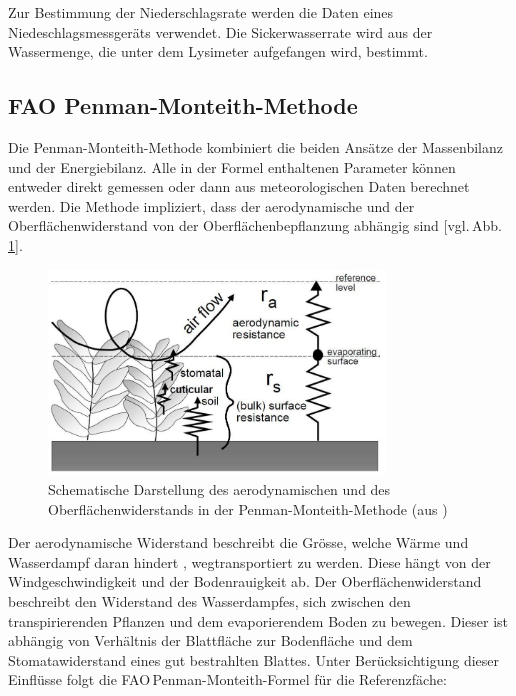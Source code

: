 Zur Bestimmung der Niederschlagsrate werden die Daten eines Niedeschlagsmessgeräts verwendet. Die Sickerwasserrate wird aus der Wassermenge, die unter dem Lysimeter aufgefangen wird, bestimmt.

\subsection{FAO Penman-Monteith-Methode}

Die Penman-Monteith-Methode kombiniert die beiden Ansätze der Massenbilanz und der Energiebilanz. Alle in der Formel enthaltenen Parameter können entweder direkt gemessen oder dann aus meteorologischen Daten berechnet werden. Die Methode impliziert, dass der aerodynamische und der Oberflächenwiderstand von der Oberflächenbepflanzung abhängig sind [vgl.\,Abb.\,\ref{fig:widerstand}]. 

\begin{figure}[H]
\centering
\includegraphics[width=0.8\textwidth]{figures/penman_widerstand.jpg}
\caption{Schematische Darstellung des aerodynamischen und des Oberflächenwiderstands in der Penman-Monteith-Methode (aus \cite{fao})}
\label{fig:widerstand}
\end{figure}

Der aerodynamische Widerstand beschreibt die Grösse, welche Wärme und Wasserdampf daran hindert , wegtransportiert zu werden. Diese hängt von der Windgeschwindigkeit und der Bodenrauigkeit ab. Der Oberflächenwiderstand beschreibt den Widerstand des Wasserdampfes, sich zwischen den transpirierenden Pflanzen und dem evaporierendem Boden zu bewegen. Dieser ist abhängig von Verhältnis der Blattfläche zur Bodenfläche und dem Stomatawiderstand eines gut bestrahlten Blattes. Unter Berücksichtigung dieser Einflüsse folgt die FAO\,Penman-Monteith-Formel für die Referenzfäche:

